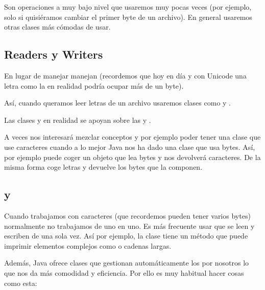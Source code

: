 \documentclass[letterpaper,10pt,spanish]{sphinxmanual}
\begin{document}
Son operaciones a muy bajo nivel que usaremos muy pocas veces (por ejemplo, solo si quisiéramos cambiar el primer byte de un archivo). En general usaremos otras clases más cómodas de usar.


\subsection{Readers y Writers}
\label{\detokenize{textos/tema3:readers-y-writers}}
En lugar de manejar  manejan  (recordemos que hoy en día y con Unicode una letra como la  en realidad podría ocupar más de un byte).

Así, cuando queramos leer letras de un archivo usaremos clases como  y .

Las clases  y  en realidad se apoyan sobre las  y .

A veces nos interesará mezclar conceptos y por ejemplo poder tener una clase que use caracteres cuando a lo mejor Java nos ha dado una clase que usa bytes. Así, por ejemplo  puede coger un objeto que lea bytes y nos devolverá caracteres. De la misma forma  coge letras y devuelve los bytes que la componen.


\subsection{ y }
\label{\detokenize{textos/tema3:bufferedreaders-y-printwriters}}
Cuando trabajamos con caracteres (que recordemos pueden tener varios bytes) normalmente no trabajamos de uno en uno. Es más frecuente usar  que se leen y escriben de una sola vez. Así por ejemplo, la clase  tiene un método  que puede imprimir elementos complejos como  o cadenas largas.

Además, Java ofrece clases que gestionan automáticamente los  por nosotros lo que nos da más comodidad y eficiencia. Por ello es muy habitual hacer cosas como esta:
\end{document}
